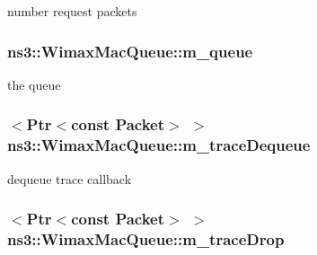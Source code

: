 number request packets 

\subsubsection[{\texorpdfstring{m\+\_\+queue}{m_queue}}]{ ns3\+::\+Wimax\+Mac\+Queue\+::m\+\_\+queue\hspace{0.3cm}{\ttfamily [private]}}\hypertarget{classns3_1_1WimaxMacQueue_ad372c20acfe0acf6df6280662d63bdae}{}\label{classns3_1_1WimaxMacQueue_ad372c20acfe0acf6df6280662d63bdae}


the queue 

\subsubsection[{\texorpdfstring{m\+\_\+trace\+Dequeue}{m_traceDequeue}}]{$<${\bf Ptr}$<$const {\bf Packet}$>$ $>$ ns3\+::\+Wimax\+Mac\+Queue\+::m\+\_\+trace\+Dequeue\hspace{0.3cm}{\ttfamily [private]}}\hypertarget{classns3_1_1WimaxMacQueue_a3a84896e087a831d26cb904927e8cbed}{}\label{classns3_1_1WimaxMacQueue_a3a84896e087a831d26cb904927e8cbed}


dequeue trace callback 

\subsubsection[{\texorpdfstring{m\+\_\+trace\+Drop}{m_traceDrop}}]{$<${\bf Ptr}$<$const {\bf Packet}$>$ $>$ ns3\+::\+Wimax\+Mac\+Queue\+::m\+\_\+trace\+Drop\hspace{0.3cm}{\ttfamily [private]}}\hypertarget{classns3_1_1WimaxMacQueue_af12e3058d4bac6a194db0fa730c2b81a}{}\label{classns3_1_1WimaxMacQueue_af12e3058d4bac6a194db0fa730c2b81a}


